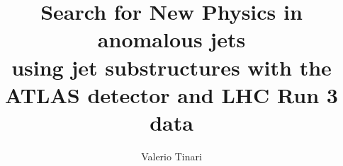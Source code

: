 \documentclass[a4paper, noexaminfo,oneside]{sapthesis}
\title{Search for New Physics in anomalous jets\\ using jet substructures with the ATLAS detector and LHC Run 3 data}
\author{Valerio Tinari}
\begin{document}
\frontmatter
\maketitle
\dedication{"Te ne sei accorto, sì\\
Che passi tutto il giorno a disegnare\\
Quella barchetta ferma in mezzo al mare\\
E non ti butti mai"\\[1em]
\textit{Brunori Sas} - \textit{La Verità}}


\newpage
\thispagestyle{empty}
\mbox{} 
\newpage
\mainmatter


\newpage
\thispagestyle{empty}
\mbox{} 
\newpage
\mainmatter
\tableofcontents

\newpage
\thispagestyle{empty}
\mbox{} 
\newpage
\mainmatter








\backmatter
\cleardoublepage

\newpage
{}
{}



\appendix




\end{document}
